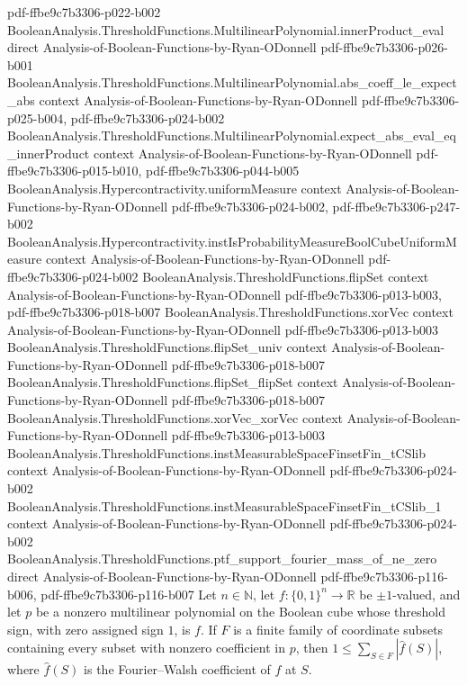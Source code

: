 \begin{theorem}
  {pdf-ffbe9c7b3306-p022-b002}
\proofstep
  {BooleanAnalysis.ThresholdFunctions.MultilinearPolynomial.innerProduct_eval}
  {direct}
  {Analysis-of-Boolean-Functions-by-Ryan-ODonnell}
  {pdf-ffbe9c7b3306-p026-b001}
\proofstep
  {BooleanAnalysis.ThresholdFunctions.MultilinearPolynomial.abs_coeff_le_expect_abs}
  {context}
  {Analysis-of-Boolean-Functions-by-Ryan-ODonnell}
  {pdf-ffbe9c7b3306-p025-b004,
    pdf-ffbe9c7b3306-p024-b002}
\proofstep
  {BooleanAnalysis.ThresholdFunctions.MultilinearPolynomial.expect_abs_eval_eq_innerProduct}
  {context}
  {Analysis-of-Boolean-Functions-by-Ryan-ODonnell}
  {pdf-ffbe9c7b3306-p015-b010,
    pdf-ffbe9c7b3306-p044-b005}
\proofstep
  {BooleanAnalysis.Hypercontractivity.uniformMeasure}
  {context}
  {Analysis-of-Boolean-Functions-by-Ryan-ODonnell}
  {pdf-ffbe9c7b3306-p024-b002,
    pdf-ffbe9c7b3306-p247-b002}
\proofstep
  {BooleanAnalysis.Hypercontractivity.instIsProbabilityMeasureBoolCubeUniformMeasure}
  {context}
  {Analysis-of-Boolean-Functions-by-Ryan-ODonnell}
  {pdf-ffbe9c7b3306-p024-b002}
\proofstep
  {BooleanAnalysis.ThresholdFunctions.flipSet}
  {context}
  {Analysis-of-Boolean-Functions-by-Ryan-ODonnell}
  {pdf-ffbe9c7b3306-p013-b003,
    pdf-ffbe9c7b3306-p018-b007}
\proofstep
  {BooleanAnalysis.ThresholdFunctions.xorVec}
  {context}
  {Analysis-of-Boolean-Functions-by-Ryan-ODonnell}
  {pdf-ffbe9c7b3306-p013-b003}
\proofstep
  {BooleanAnalysis.ThresholdFunctions.flipSet_univ}
  {context}
  {Analysis-of-Boolean-Functions-by-Ryan-ODonnell}
  {pdf-ffbe9c7b3306-p018-b007}
\proofstep
  {BooleanAnalysis.ThresholdFunctions.flipSet_flipSet}
  {context}
  {Analysis-of-Boolean-Functions-by-Ryan-ODonnell}
  {pdf-ffbe9c7b3306-p018-b007}
\proofstep
  {BooleanAnalysis.ThresholdFunctions.xorVec_xorVec}
  {context}
  {Analysis-of-Boolean-Functions-by-Ryan-ODonnell}
  {pdf-ffbe9c7b3306-p013-b003}
\proofstep
  {BooleanAnalysis.ThresholdFunctions.instMeasurableSpaceFinsetFin_tCSlib}
  {context}
  {Analysis-of-Boolean-Functions-by-Ryan-ODonnell}
  {pdf-ffbe9c7b3306-p024-b002}
\proofstep
  {BooleanAnalysis.ThresholdFunctions.instMeasurableSpaceFinsetFin_tCSlib_1}
  {context}
  {Analysis-of-Boolean-Functions-by-Ryan-ODonnell}
  {pdf-ffbe9c7b3306-p024-b002}
\proofstep
  {BooleanAnalysis.ThresholdFunctions.ptf_support_fourier_mass_of_ne_zero}
  {direct}
  {Analysis-of-Boolean-Functions-by-Ryan-ODonnell}
  {pdf-ffbe9c7b3306-p116-b006,
    pdf-ffbe9c7b3306-p116-b007}
Let $n\in\mathbb N$, let $f:\{0,1\}^n\to\mathbb R$ be $\pm1$-valued, and let $p$ be a
nonzero multilinear polynomial on the Boolean cube whose threshold sign, with zero
assigned sign $1$, is $f$. If $F$ is a finite family of coordinate subsets containing
every subset with nonzero coefficient in $p$, then $1\leq\sum_{S\in F}|\widehat f(S)|$,
where $\widehat f(S)$ is the Fourier–Walsh coefficient of $f$ at $S$.
\end{theorem}

